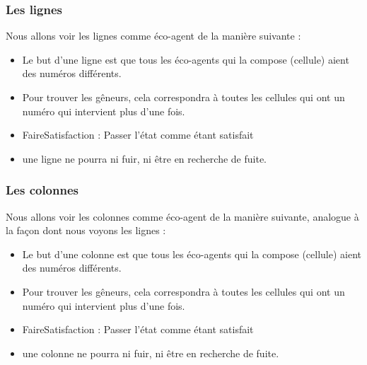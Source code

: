             \subsubsection{Les lignes}
                Nous allons voir les lignes comme éco-agent de la manière suivante : \\
                \begin{itemize}
                    \item Le but d'une ligne est que tous les éco-agents qui la compose (cellule) aient des numéros différents.
                    \item Pour trouver les gêneurs, cela correspondra à toutes les cellules qui ont un numéro qui intervient plus d'une fois. 
                    \item FaireSatisfaction : Passer l'état comme étant satisfait
                    \item une ligne ne pourra ni fuir, ni être en recherche de fuite.   
                \end{itemize}
            \subsubsection{Les colonnes}
                Nous allons voir les colonnes comme éco-agent de la manière suivante, analogue à la façon dont nous voyons les lignes : \\
                \begin{itemize}
                    \item Le but d'une colonne est que tous les éco-agents qui la compose (cellule) aient des numéros différents.
                    \item Pour trouver les gêneurs, cela correspondra à toutes les cellules qui ont un numéro qui intervient plus d'une fois. 
                    \item FaireSatisfaction : Passer l'état comme étant satisfait
                    \item une colonne ne pourra ni fuir, ni être en recherche de fuite.   
                \end{itemize}

